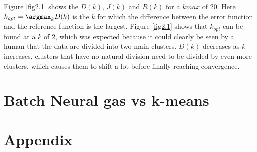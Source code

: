 \documentclass[10pt]{article}
\begin{document}
\noindent Figure \ref{fig2.1} shows the $D(k)$, $J(k)$ and $R(k)$ for a $kmax$ of 20. Here $k_{opt} = \argmax_k D(k)$ is the $k$ for which the difference between the error function and the reference function is the largest. Figure \ref{fig2.1} shows that $k_{opt}$ can be found at a $k$ of 2, which was expected because it could clearly be seen by a human that the data are divided into two main clusters. $D(k)$ decreases as $k$ increases, clusters that have no natural division need to be divided by even more clusters, which causes them to shift a lot before finally reaching convergence.

\subsection{}
\subsubsection{}


\section{Batch Neural gas vs k-means}

\section*{Appendix}
{\label{kmeans}}
{\label{runKMeans}}
\end{document}
